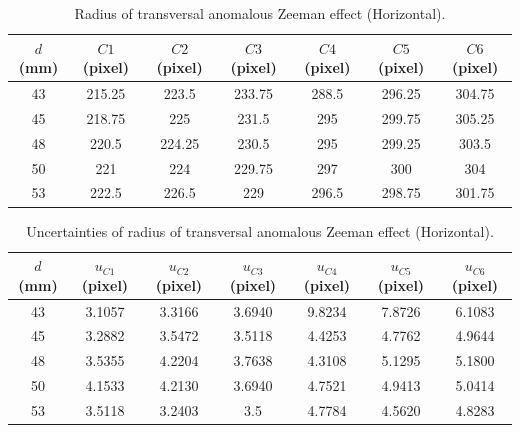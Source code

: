\documentclass[a4paper,12pt]{article}
\begin{document}
    \begin{table}[H]
        \centering
        \caption{Radius of transversal anomalous Zeeman effect (Horizontal).}
        \begin{tabular}{c|c|c|c|c|c|c}
            $d $ (mm)& $C1 $ (pixel)& $C2 $ (pixel)& $C3 $ (pixel)& $C4 $ (pixel)& $C5 $ (pixel)& $C6 $ (pixel)\\ \hline \hline
            43&	215.25	&223.5	&233.75	&288.5	&296.25	&304.75 \\ \hline
            45&	218.75	&225	&231.5	&295	&299.75	&305.25 \\ \hline
            48&	220.5	&224.25	&230.5	&295	&299.25	&303.5 \\ \hline
            50& 221	    &224	&229.75	&297	&300	&304 \\ \hline
            53&	222.5	&226.5	&229	&296.5	&298.75	&301.75 \\ \hline
        \end{tabular}
        \label{tab:tra_ano_hor}
    \end{table}
    
    \begin{table}[H]
        \centering
        \caption{Uncertainties of radius of transversal anomalous Zeeman effect (Horizontal).}
        \begin{tabular}{c|c|c|c|c|c|c}
            $d $ (mm)& $u_{C1} $ (pixel)& $u_{C2} $ (pixel)& $u_{C3} $ (pixel)& $u_{C4} $ (pixel)& $u_{C5} $ (pixel)& $u_{C6} $ (pixel) \\ \hline \hline
            43&3.1057&3.3166&3.6940&9.8234&7.8726&6.1083  \\ \hline
            45&3.2882&3.5472&3.5118&4.4253&4.7762&4.9644 \\ \hline
            48&3.5355&4.2204&3.7638&4.3108&5.1295&5.1800  \\ \hline
            50&4.1533&4.2130&3.6940&4.7521&4.9413&5.0414 \\ \hline
            53&3.5118&3.2403&3.5   &4.7784&4.5620&4.8283 \\ \hline
        \end{tabular}
        \label{tab:tra_ano_ver_un}
    \end{table}
    
\end{document}
